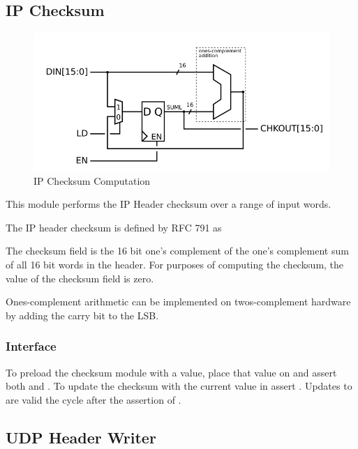 \subsection{IP Checksum}

\begin{figure}
\begin{centering}
\includegraphics[scale=0.8]{ipchecksum.svg}
\end{centering}
\caption{IP Checksum Computation}
\label{ipchecksum}
\end{figure}

This module performs the IP Header checksum over a range of input words. 

The IP header checksum is defined by RFC 791 as

\begin{blockquote}
      The checksum field is the 16 bit one's complement of the one's
complement sum of all 16 bit words in the header.  For purposes of
computing the checksum, the value of the checksum field is zero.
\end{blockquote}

Ones-complement arithmetic can be implemented on twos-complement
hardware by adding the carry bit to the LSB.


\subsubsection{Interface}
To preload the checksum module with a value, place that value on
 and assert both  and . To
update the checksum with the current value in 
assert . Updates to  are valid the
cycle after the assertion of .

\subsection{UDP Header Writer}

